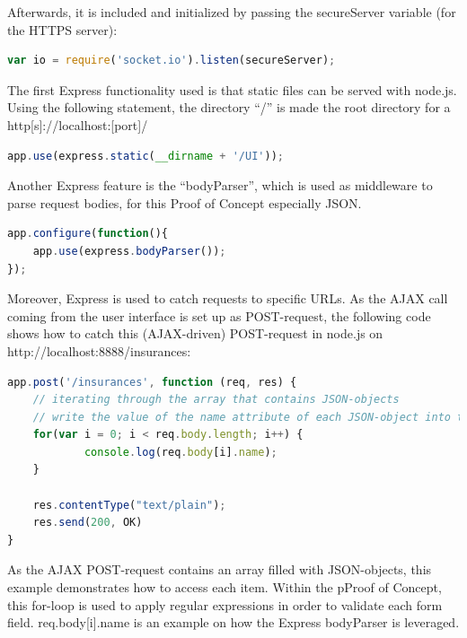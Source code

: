 Afterwards, it is included and initialized by passing the secureServer variable (for the HTTPS server):

\begin{lstlisting}[language=javascript,caption={Starting servers}]
var io = require('socket.io').listen(secureServer);
\end{lstlisting}

The first Express functionality used is that static files can be served with node.js. Using the following statement, the directory “/” is made the root directory for a http[s]://localhost:[port]/

\begin{lstlisting}[language=javascript,caption={Serving static assets with Express}]
app.use(express.static(__dirname + '/UI'));
\end{lstlisting}

Another Express feature is the “bodyParser”, which is used as middleware to parse request bodies, for this Proof of Concept especially JSON.

\begin{lstlisting}[language=javascript,caption={Using the bodyParser}]
app.configure(function(){
    app.use(express.bodyParser());
});
\end{lstlisting}

Moreover, Express is used to catch requests to specific URLs. As the AJAX call coming from the user interface is set up as POST-request, the following code shows how to catch this (AJAX-driven) POST-request in node.js on http://localhost:8888/insurances:

\begin{lstlisting}[language=javascript,caption={Iteration through an array consisting of JSON data}]
app.post('/insurances', function (req, res) {
	// iterating through the array that contains JSON-objects
	// write the value of the name attribute of each JSON-object into the console
	for(var i = 0; i < req.body.length; i++) {
        	console.log(req.body[i].name);
	}

	res.contentType("text/plain");
	res.send(200, OK)
}
\end{lstlisting}

As the AJAX POST-request contains an array filled with JSON-objects, this
example demonstrates how to access each item. Within the pProof of Concept, this
for-loop is used to apply regular expressions in order to validate each form
field. req.body[i].name is an example on how the Express bodyParser is leveraged.\\

